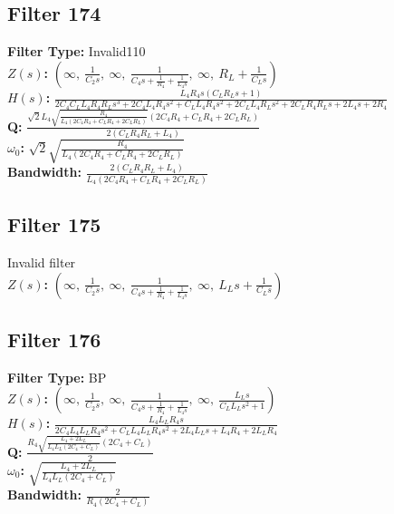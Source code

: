 \documentclass{article}
\begin{document}
\subsection*{Filter 174}
\textbf{Filter Type:} Invalid110 \\ 
\textbf{$Z(s)$:} $\left( \infty, \  \frac{1}{C_{2} s}, \  \infty, \  \frac{1}{C_{4} s + \frac{1}{R_{4}} + \frac{1}{L_{4} s}}, \  \infty, \  R_{L} + \frac{1}{C_{L} s}\right)$ \\ 
\textbf{$H(s)$:} $\frac{L_{4} R_{4} s \left(C_{L} R_{L} s + 1\right)}{2 C_{4} C_{L} L_{4} R_{4} R_{L} s^{3} + 2 C_{4} L_{4} R_{4} s^{2} + C_{L} L_{4} R_{4} s^{2} + 2 C_{L} L_{4} R_{L} s^{2} + 2 C_{L} R_{4} R_{L} s + 2 L_{4} s + 2 R_{4}}$ \\ 
\textbf{Q:} $\frac{\sqrt{2} L_{4} \sqrt{\frac{R_{4}}{L_{4} \left(2 C_{4} R_{4} + C_{L} R_{4} + 2 C_{L} R_{L}\right)}} \left(2 C_{4} R_{4} + C_{L} R_{4} + 2 C_{L} R_{L}\right)}{2 \left(C_{L} R_{4} R_{L} + L_{4}\right)}$ \\ 
\textbf{$\omega_0$:} $\sqrt{2} \sqrt{\frac{R_{4}}{L_{4} \left(2 C_{4} R_{4} + C_{L} R_{4} + 2 C_{L} R_{L}\right)}}$ \\ 
\textbf{Bandwidth:} $\frac{2 \left(C_{L} R_{4} R_{L} + L_{4}\right)}{L_{4} \left(2 C_{4} R_{4} + C_{L} R_{4} + 2 C_{L} R_{L}\right)}$ \\ 
\subsection*{Filter 175}
Invalid filter \\ 
\textbf{$Z(s)$:} $\left( \infty, \  \frac{1}{C_{2} s}, \  \infty, \  \frac{1}{C_{4} s + \frac{1}{R_{4}} + \frac{1}{L_{4} s}}, \  \infty, \  L_{L} s + \frac{1}{C_{L} s}\right)$ \\ 
\subsection*{Filter 176}
\textbf{Filter Type:} BP \\ 
\textbf{$Z(s)$:} $\left( \infty, \  \frac{1}{C_{2} s}, \  \infty, \  \frac{1}{C_{4} s + \frac{1}{R_{4}} + \frac{1}{L_{4} s}}, \  \infty, \  \frac{L_{L} s}{C_{L} L_{L} s^{2} + 1}\right)$ \\ 
\textbf{$H(s)$:} $\frac{L_{4} L_{L} R_{4} s}{2 C_{4} L_{4} L_{L} R_{4} s^{2} + C_{L} L_{4} L_{L} R_{4} s^{2} + 2 L_{4} L_{L} s + L_{4} R_{4} + 2 L_{L} R_{4}}$ \\ 
\textbf{Q:} $\frac{R_{4} \sqrt{\frac{L_{4} + 2 L_{L}}{L_{4} L_{L} \left(2 C_{4} + C_{L}\right)}} \left(2 C_{4} + C_{L}\right)}{2}$ \\ 
\textbf{$\omega_0$:} $\sqrt{\frac{L_{4} + 2 L_{L}}{L_{4} L_{L} \left(2 C_{4} + C_{L}\right)}}$ \\ 
\textbf{Bandwidth:} $\frac{2}{R_{4} \left(2 C_{4} + C_{L}\right)}$ \\ 
\end{document}
